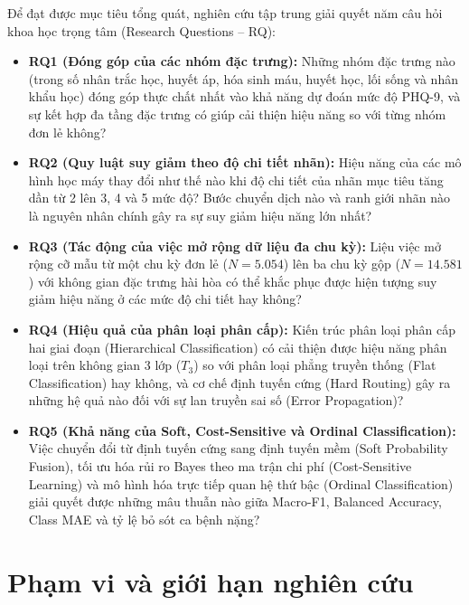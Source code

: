 Để đạt được mục tiêu tổng quát, nghiên cứu tập trung giải quyết năm câu hỏi khoa học trọng tâm (Research Questions -- RQ):
\begin{itemize}
    \item \textbf{RQ1 (Đóng góp của các nhóm đặc trưng):} Những nhóm đặc trưng nào (trong số nhân trắc học, huyết áp, hóa sinh máu, huyết học, lối sống và nhân khẩu học) đóng góp thực chất nhất vào khả năng dự đoán mức độ PHQ-9, và sự kết hợp đa tầng đặc trưng có giúp cải thiện hiệu năng so với từng nhóm đơn lẻ không?
    \item \textbf{RQ2 (Quy luật suy giảm theo độ chi tiết nhãn):} Hiệu năng của các mô hình học máy thay đổi như thế nào khi độ chi tiết của nhãn mục tiêu tăng dần từ 2 lên 3, 4 và 5 mức độ? Bước chuyển dịch nào và ranh giới nhãn nào là nguyên nhân chính gây ra sự suy giảm hiệu năng lớn nhất?
    \item \textbf{RQ3 (Tác động của việc mở rộng dữ liệu đa chu kỳ):} Liệu việc mở rộng cỡ mẫu từ một chu kỳ đơn lẻ ($N = 5.054$) lên ba chu kỳ gộp ($N = 14.581$) với không gian đặc trưng hài hòa có thể khắc phục được hiện tượng suy giảm hiệu năng ở các mức độ chi tiết hay không?
    \item \textbf{RQ4 (Hiệu quả của phân loại phân cấp):} Kiến trúc phân loại phân cấp hai giai đoạn (Hierarchical Classification) có cải thiện được hiệu năng phân loại trên không gian 3 lớp ($T_3$) so với phân loại phẳng truyền thống (Flat Classification) hay không, và cơ chế định tuyến cứng (Hard Routing) gây ra những hệ quả nào đối với sự lan truyền sai số (Error Propagation)?
    \item \textbf{RQ5 (Khả năng của Soft, Cost-Sensitive và Ordinal Classification):} Việc chuyển đổi từ định tuyến cứng sang định tuyến mềm (Soft Probability Fusion), tối ưu hóa rủi ro Bayes theo ma trận chi phí (Cost-Sensitive Learning) và mô hình hóa trực tiếp quan hệ thứ bậc (Ordinal Classification) giải quyết được những mâu thuẫn nào giữa Macro-F1, Balanced Accuracy, Class MAE và tỷ lệ bỏ sót ca bệnh nặng?
\end{itemize}

\section{Phạm vi và giới hạn nghiên cứu}
\label{sec:pham-vi-nghien-cuu}

